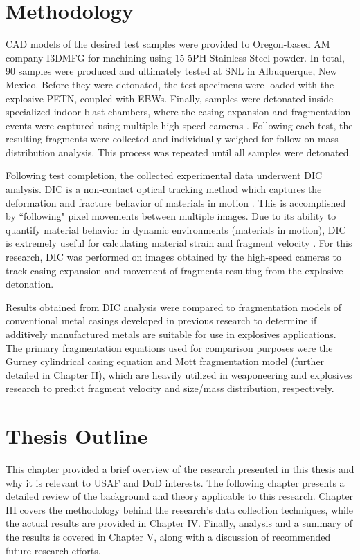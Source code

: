 \section{Methodology}

\gls{CAD} models of the desired test samples were provided to Oregon-based \gls{AM} company I3DMFG for machining using 15-5PH Stainless Steel powder. In total, 90 samples were produced and ultimately tested at \gls{SNL} in Albuquerque, New Mexico. Before they were detonated, the test specimens were loaded with the explosive \gls{PETN}, coupled with \glspl{EBW}. Finally, samples were detonated inside specialized indoor blast chambers, where the casing expansion and fragmentation events were captured using multiple high-speed cameras \cite{TeledyneRP-80}. Following each test, the resulting fragments were collected and individually weighed for follow-on mass distribution analysis. This process was repeated until all samples were detonated.
  
Following test completion, the collected experimental data underwent \gls{DIC} analysis. \gls{DIC} is a non-contact optical tracking method which captures the deformation and fracture behavior of materials in motion \cite{DICimageObservations}. This is accomplished by ``following" pixel movements between multiple images. Due to its ability to quantify material behavior in dynamic environments (materials in motion), \gls{DIC} is extremely useful for calculating material strain and fragment velocity \cite{ReuDICapplication}. For this research, \gls{DIC} was performed on images obtained by the high-speed cameras to track casing expansion and movement of fragments resulting from the explosive detonation.  

Results obtained from \gls{DIC} analysis were compared to fragmentation models of conventional metal casings developed in previous research to determine if additively manufactured metals are suitable for use in explosives applications. The primary fragmentation equations used for comparison purposes were the Gurney cylindrical casing equation and Mott fragmentation model (further detailed in Chapter II), which are heavily utilized in weaponeering and explosives research to predict fragment velocity and size/mass distribution, respectively.

\section{Thesis Outline}

This chapter provided a brief overview of the research presented in this thesis and why it is relevant to \gls{USAF} and \gls{DoD} interests. The following chapter presents a detailed review of the background and theory applicable to this research. Chapter III covers the methodology behind the research's data collection techniques, while the actual results are provided in Chapter IV. Finally, analysis and a summary of the results is covered in Chapter V, along with a discussion of recommended future research efforts.   